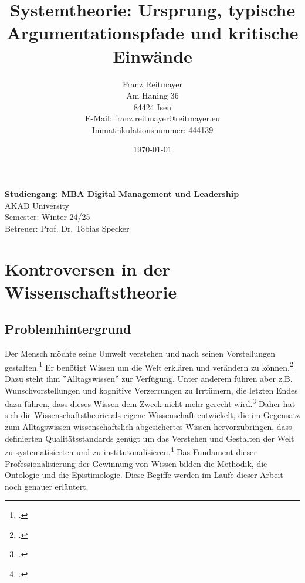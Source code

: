 \documentclass[a4paper,12pt]{article}
\title{Systemtheorie: Ursprung, typische Argumentationspfade und kritische Einwände}
\date{\today}
\begin{document}
\author{
    Franz Reitmayer \\
    Am Haning 36 \\
    84424 Isen \\
    E-Mail: franz.reitmayer@reitmayer.eu \\ 
    Immatrikulationsnummer: 444139
}

\maketitle
\vfill
\begin{center}
\textbf{Studiengang: MBA Digital Management und Leadership} \\
AKAD University \\
Semester: Winter 24/25 \\
Betreuer: Prof. Dr. Tobias Specker \\

\end{center}
\vfill
\newpage
\tableofcontents
\newpage


\section{Kontroversen in der Wissenschaftstheorie}
\subsection{Problemhintergrund}
Der Mensch möchte seine Umwelt verstehen und nach seinen Vorstellungen gestalten.\footcite[Seite 4]{Helfrich2024} Er benötigt Wissen um die Welt erklären und verändern zu können.\footcite[Seite 1]{Helfrich2024} Dazu steht ihm ''Alltagswissen'' zur Verfügung. Unter anderem führen aber z.B. Wunschvorstellungen und kognitive Verzerrungen zu Irrtümern, die letzten Endes dazu führen, dass dieses Wissen dem Zweck nicht mehr gerecht wird.\footcite[Seite 9]{Helfrich2024} Daher hat sich die Wissenschaftstheorie als eigene Wissenschaft entwickelt, die im Gegensatz zum Alltagswissen wissenschaftslich abgesichertes Wissen hervorzubringen, dass definierten Qualitätsstandards genügt um das Verstehen und Gestalten der Welt zu systematisierten und zu institutonalisieren.\footcite[Seite 4]{Kornmeier2007} Das Fundament dieser Professionalisierung der Gewinnung von Wissen bilden die Methodik, die Ontologie und die Epistimologie. Diese Begiffe werden im Laufe dieser Arbeit noch genauer erläutert.
\end{document}
